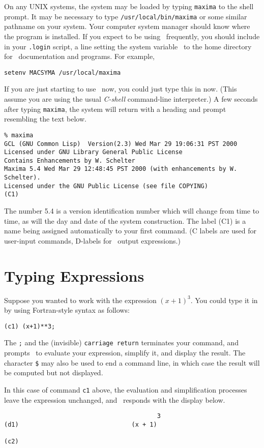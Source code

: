 On any UNIX systems, the system may be loaded by typing {\tt maxima}
to the shell prompt. It may be necessary to type 
\hbox{\verb|/usr/local/bin/maxima|}
or some similar pathname on your system.
Your computer system manager should know where the program is
installed.
If you expect to be using \Max\ frequently, you should
include in your {\tt .login} script, a line setting the system variable \Max\
to the home directory for \Max\ documentation and programs.  For example,
\begin{verbatim}
setenv MACSYMA /usr/local/maxima
\end{verbatim}
If you are just starting to use \Max\
now, you could just type this in now. (This assume you are using the
usual {\it C-shell} command-line interpreter.)
A few seconds after typing {\tt maxima}, the system will return with a 
heading and prompt resembling the text below.
{\footnotesize \begin{verbatim}
% maxima
GCL (GNU Common Lisp)  Version(2.3) Wed Mar 29 19:06:31 PST 2000
Licensed under GNU Library General Public License
Contains Enhancements by W. Schelter
Maxima 5.4 Wed Mar 29 12:48:45 PST 2000 (with enhancements by W. Schelter).
Licensed under the GNU Public License (see file COPYING)
(C1)              
\end{verbatim}}
The number 5.4 is a version identification number which will change
from time to time, as will the day and date of the system construction.
The label (C1) is a name being assigned
automatically to your first command. (C labels are used for user-input
commands, D-labels for
\Max\
output expressions.)

\section{Typing Expressions}

Suppose you wanted to work with the expression $(x + 1)^3$. You
could type it in by using Fortran-style syntax as follows:
\begin{verbatim}
(c1) (x+1)**3;
\end{verbatim}
The {\tt ;} and the (invisible) {\tt carriage return} terminates your command, 
and prompts \Max\
to evaluate your expression, simplify it, and display the result.
The character {\tt \$} may also be used to end a command line, in which
case the result will be computed but not displayed.

In this case of command {\tt c1} above, the evaluation and simplification 
processes leave the expression unchanged, and \Max\ responds with the display 
below.
\begin{verbatim}
                                          3
(d1)                               (x + 1)

(c2)
\end{verbatim}

